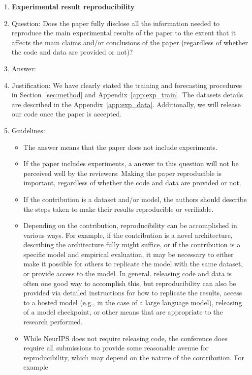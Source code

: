 \documentclass{article}
\begin{document}
\begin{enumerate}
    \item {\bf Experimental result reproducibility}
    \item[] Question: Does the paper fully disclose all the information needed to reproduce the main experimental results of the paper to the extent that it affects the main claims and/or conclusions of the paper (regardless of whether the code and data are provided or not)?
    \item[] Answer: \answerYes{} %
    \item[] Justification: We have clearly stated the training and forecasting procedures in Section~\ref{sec:method} and Appendix~\ref{app:exp_train}. The datasets details are described in the Appendix~\ref{app:exp_data}. Additionally, we will release our code once the paper is accepted.
    \item[] Guidelines:
    \begin{itemize}
        \item The answer \answerNA{} means that the paper does not include experiments.
        \item If the paper includes experiments, a \answerNo{} answer to this question will not be perceived well by the reviewers: Making the paper reproducible is important, regardless of whether the code and data are provided or not.
        \item If the contribution is a dataset and\slash or model, the authors should describe the steps taken to make their results reproducible or verifiable. 
        \item Depending on the contribution, reproducibility can be accomplished in various ways. For example, if the contribution is a novel architecture, describing the architecture fully might suffice, or if the contribution is a specific model and empirical evaluation, it may be necessary to either make it possible for others to replicate the model with the same dataset, or provide access to the model. In general. releasing code and data is often one good way to accomplish this, but reproducibility can also be provided via detailed instructions for how to replicate the results, access to a hosted model (e.g., in the case of a large language model), releasing of a model checkpoint, or other means that are appropriate to the research performed.
        \item While NeurIPS does not require releasing code, the conference does require all submissions to provide some reasonable avenue for reproducibility, which may depend on the nature of the contribution. For example

\end{itemize}
\end{enumerate}
\end{document}
